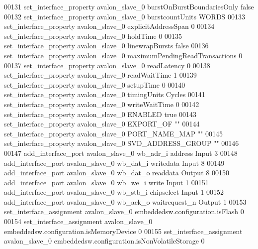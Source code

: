 \begin{DoxyCode}
00131 \textcolor{comment}{}set\_interface\_property avalon\_slave\_0 burstOnBurstBoundariesOnly false\textcolor{comment}{}
00132 \textcolor{comment}{}set\_interface\_property avalon\_slave\_0 burstcountUnits WORDS\textcolor{comment}{}
00133 \textcolor{comment}{}set\_interface\_property avalon\_slave\_0 explicitAddressSpan 0\textcolor{comment}{}
00134 \textcolor{comment}{}set\_interface\_property avalon\_slave\_0 holdTime 0\textcolor{comment}{}
00135 \textcolor{comment}{}set\_interface\_property avalon\_slave\_0 linewrapBursts false\textcolor{comment}{}
00136 \textcolor{comment}{}set\_interface\_property avalon\_slave\_0 maximumPendingReadTransactions 0\textcolor{comment}{}
00137 \textcolor{comment}{}set\_interface\_property avalon\_slave\_0 readLatency 0\textcolor{comment}{}
00138 \textcolor{comment}{}set\_interface\_property avalon\_slave\_0 readWaitTime 1\textcolor{comment}{}
00139 \textcolor{comment}{}set\_interface\_property avalon\_slave\_0 setupTime 0\textcolor{comment}{}
00140 \textcolor{comment}{}set\_interface\_property avalon\_slave\_0 timingUnits Cycles\textcolor{comment}{}
00141 \textcolor{comment}{}set\_interface\_property avalon\_slave\_0 writeWaitTime 0\textcolor{comment}{}
00142 \textcolor{comment}{}set\_interface\_property avalon\_slave\_0 ENABLED true\textcolor{comment}{}
00143 \textcolor{comment}{}set\_interface\_property avalon\_slave\_0 EXPORT\_OF ""\textcolor{comment}{}
00144 \textcolor{comment}{}set\_interface\_property avalon\_slave\_0 PORT\_NAME\_MAP ""\textcolor{comment}{}
00145 \textcolor{comment}{}set\_interface\_property avalon\_slave\_0 SVD\_ADDRESS\_GROUP ""\textcolor{comment}{}
00146 \textcolor{comment}{}
00147 add\_interface\_port avalon\_slave\_0 wb\_adr\_i address Input 3\textcolor{comment}{}
00148 \textcolor{comment}{}add\_interface\_port avalon\_slave\_0 wb\_dat\_i writedata Input 8\textcolor{comment}{}
00149 \textcolor{comment}{}add\_interface\_port avalon\_slave\_0 wb\_dat\_o readdata Output 8\textcolor{comment}{}
00150 \textcolor{comment}{}add\_interface\_port avalon\_slave\_0 wb\_we\_i write Input 1\textcolor{comment}{}
00151 \textcolor{comment}{}add\_interface\_port avalon\_slave\_0 wb\_stb\_i chipselect Input 1\textcolor{comment}{}
00152 \textcolor{comment}{}add\_interface\_port avalon\_slave\_0 wb\_ack\_o waitrequest\_n Output 1\textcolor{comment}{}
00153 \textcolor{comment}{}set\_interface\_assignment avalon\_slave\_0 embeddedsw.configuration.isFlash 0\textcolor{comment}{}
00154 \textcolor{comment}{}set\_interface\_assignment avalon\_slave\_0 embeddedsw.configuration.isMemoryDevice 0\textcolor{comment}{}
00155 \textcolor{comment}{}set\_interface\_assignment avalon\_slave\_0 embeddedsw.configuration.isNonVolatileStorage 0\textcolor{comment}{}

\end{DoxyCode}
